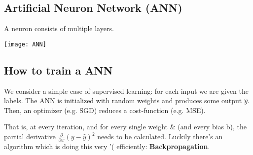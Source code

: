 \subsection{Artificial Neuron Network (ANN)}
\begin{minipage}{0,25\linewidth}
	  A neuron consists of multiple layers.
\end{minipage}
\begin{minipage}{0,75\linewidth}
	  \texttt{[image: ANN]}
\end{minipage}

\subsection{How to train a ANN}
 We consider a simple case of supervised learning: for each input we are given the labels. The ANN is initialized with random weights and produces some output  $\hat{y}$. Then, an optimizer (e.g. SGD) reduces a cost-function (e.g. MSE).
 
  That is, at every iteration, and for every single weight \& (and every bias b), the partial derivative $\frac{\partial }{\partial w} (y-\hat{y})^2$ needs to be calculated. Luckily there's an algorithm which is doing this very '(
efficiently: \textbf{Backpropagation}.  



